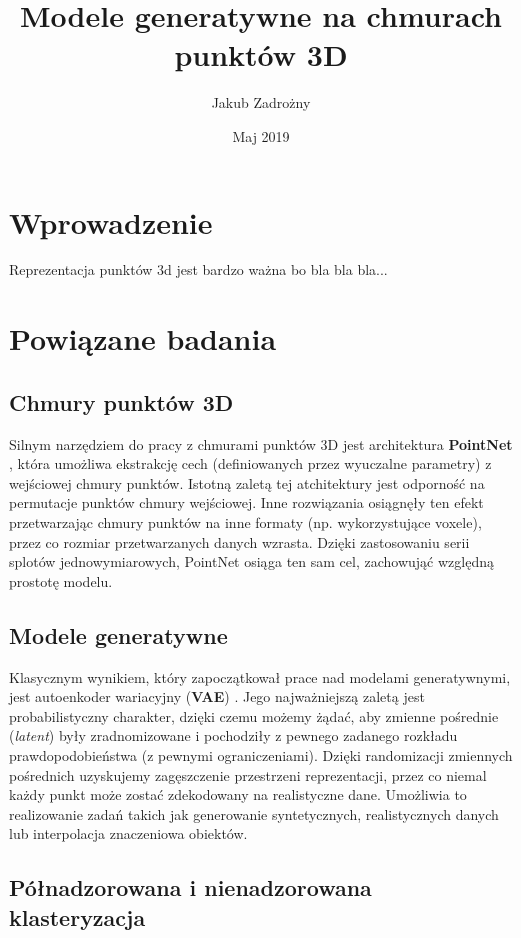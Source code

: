 \documentclass[12pt]{extarticle}
\title{Modele generatywne na chmurach punktów 3D}
\author{Jakub Zadrożny}
\date{Maj 2019}
\begin{document}
\maketitle

\section{Wprowadzenie}
Reprezentacja punktów 3d jest bardzo ważna bo bla bla bla...

\section{Powiązane badania}

\subsection{Chmury punktów 3D}
\label{sec:related_pointnet}
Silnym narzędziem do pracy z chmurami punktów 3D jest architektura \textbf{PointNet} \cite{pointnet},
która umożliwa ekstrakcję cech (definiowanych przez wyuczalne parametry) z wejściowej chmury punktów.
Istotną zaletą tej atchitektury jest odporność na permutacje punktów chmury wejściowej.
Inne rozwiązania osiągnęły ten efekt przetwarzając chmury punktów na inne formaty (np. wykorzystujące voxele),
przez co rozmiar przetwarzanych danych wzrasta. Dzięki zastosowaniu serii splotów jednowymiarowych,
PointNet osiąga ten sam cel, zachowująć względną prostotę modelu.

\subsection{Modele generatywne}
Klasycznym wynikiem, który zapoczątkował prace nad modelami generatywnymi, jest autoenkoder wariacyjny
(\textbf{VAE}) \cite{vae}. Jego najważniejszą zaletą jest probabilistyczny charakter,
dzięki czemu możemy żądać, aby zmienne pośrednie (\textit{latent}) były zradnomizowane i pochodziły
z pewnego zadanego rozkładu prawdopodobieństwa (z pewnymi ograniczeniami).
Dzięki randomizacji zmiennych pośrednich uzyskujemy zagęszczenie przestrzeni reprezentacji,
przez co niemal każdy punkt może zostać zdekodowany na realistyczne dane.
Umożliwia to realizowanie zadań takich jak generowanie syntetycznych,
realistycznych danych lub interpolacja znaczeniowa obiektów.

\subsection{Półnadzorowana i nienadzorowana klasteryzacja}
\end{document}
